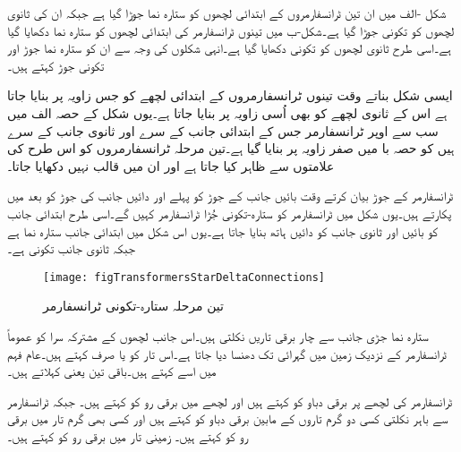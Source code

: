 شکل -الف میں ان تین ٹرانسفارمروں کے ابتدائی لچھوں کو ستارہ نما جوڑا گیا ہے جبکہ ان کی ثانوی لچھوں کو تکونی جوڑا گیا ہے۔شکل-ب میں تینوں ٹرانسفارمر کی ابتدائی لچھوں کو  ستارہ نما  دکھایا گیا ہے۔اسی طرح ثانوی لچھوں کو تکونی  دکھایا گیا ہے۔انہی شکلوں کی وجہ سے ان کو ستارہ نما جوڑ اور تکونی جوڑ کہتے ہیں۔

ایسی شکل بناتے وقت تینوں ٹرانسفارمروں کے ابتدائی لچھے کو جس زاویہ پر بنایا جاتا ہے اس کے ثانوی لچھے کو بھی اُسی زاویہ پر بنایا جاتا ہے۔یوں شکل کے حصہ الف میں سب سے اوپر ٹرانسفارمر جس کے ابتدائی جانب کے  سرے  اور ثانوی جانب  کے سرے  ہیں کو حصہ با میں صفر زاویہ پر بنایا گیا ہے۔تین  مرحلہ ٹرانسفارمروں کو اس طرح کی علامتوں سے ظاہر کیا جاتا ہے اور ان میں قالب نہیں دکھایا جاتا۔

ٹرانسفارمر کے جوڑ بیان کرتے وقت بائیں جانب کے جوڑ کو پہلے اور دائیں جانب کی جوڑ کو بعد میں پکارتے ہیں۔یوں شکل میں ٹرانسفارمر کو ستارہ-تکونی جُڑا ٹرانسفارمر کہیں گے۔اسی طرح ابتدائی جانب کو بائیں اور ثانوی جانب کو دائیں ہاتھ بنایا جاتا ہے۔یوں اس شکل میں ابتدائی جانب ستارہ نما ہے جبکہ ثانوی جانب تکونی ہے۔
\begin{figure}
\centering
\texttt{[image: figTransformersStarDeltaConnections]}
\caption{تین مرحلہ ستارہ-تکونی ٹرانسفارمر}
\label{شکل_ٹرانسفارمر_ستارہ_تکونی_جوڑ}
\end{figure}


	ستارہ نما جڑی جانب سے چار برقی تاریں نکلتی ہیں۔اس جانب لچھوں کے مشترکہ سرا  کو عموماً ٹرانسفارمر کے نزدیک زمین میں گہرائی تک دھنسا دیا جاتا ہے۔اس تار کو   یا صرف   کہتے ہیں۔عام فہم میں اسے  کہتے ہیں۔باقی تین یعنی    کہلاتے ہیں۔

ٹرانسفارمر کی لچھے پر برقی دباو کو   کہتے ہیں اور لچھے میں برقی رو کو    کہتے ہیں۔ جبکہ ٹرانسفارمر سے باہر نکلتی کسی دو گرم تاروں کے مابین برقی دباو کو   کہتے ہیں اور کسی بھی گرم تار میں برقی رو کو    کہتے ہیں۔ زمینی تار میں برقی رو کو    کہتے ہیں۔

